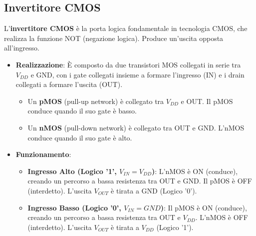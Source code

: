 \subsection{Invertitore CMOS}
L'\textbf{invertitore CMOS} è la porta logica fondamentale in tecnologia CMOS, che realizza la funzione NOT (negazione logica). Produce un'uscita opposta all'ingresso.
\begin{itemize}
    \item \textbf{Realizzazione}: È composto da due transistori MOS collegati in serie tra $V_{DD}$ e GND, con i gate collegati insieme a formare l'ingresso (IN) e i drain collegati a formare l'uscita (OUT).
    \begin{itemize}
        \item Un \textbf{pMOS} (pull-up network) è collegato tra $V_{DD}$ e OUT. Il pMOS conduce quando il suo gate è basso.
        \item Un \textbf{nMOS} (pull-down network) è collegato tra OUT e GND. L'nMOS conduce quando il suo gate è alto.
    \end{itemize}
    \item \textbf{Funzionamento}:
    \begin{itemize}
        \item \textbf{Ingresso Alto (Logico '1', $V_{IN} = V_{DD}$)}: L'nMOS è ON (conduce), creando un percorso a bassa resistenza tra OUT e GND. Il pMOS è OFF (interdetto). L'uscita $V_{OUT}$ è tirata a GND (Logico '0').
        \item \textbf{Ingresso Basso (Logico '0', $V_{IN} = GND$)}: Il pMOS è ON (conduce), creando un percorso a bassa resistenza tra OUT e $V_{DD}$. L'nMOS è OFF (interdetto). L'uscita $V_{OUT}$ è tirata a $V_{DD}$ (Logico '1').
    \end{itemize}
\end{itemize}

